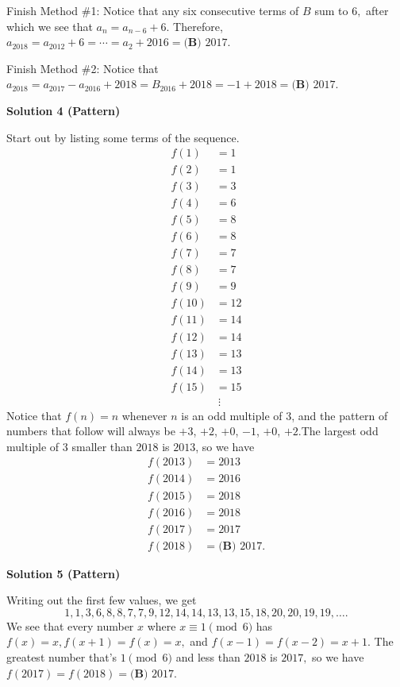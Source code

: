\begin{enumerate}
 Finish Method \#1: Notice that any six consecutive terms of $B$ sum to $6,$ after which we see that $a_n = a_{n-6} + 6.$ Therefore, $a_{2018} = a_{2012} + 6 = \cdots = a_{2} + 2016 = \boxed{\textbf{(B) } 2017}.$

 Finish Method \#2: Notice that $a_{2018} = a_{2017} - a_{2016} + 2018 = B_{2016} + 2018 = -1 + 2018 = \boxed{\textbf{(B) } 2017}.$




\textbf{Solution 4 (Pattern)}

Start out by listing some terms of the sequence. 
 \begin{align*} f(1)&=1 \\ f(2)&=1 \\ f(3)&=3 \\ f(4)&=6 \\ f(5)&=8 \\ f(6)&=8 \\  f(7)&=7 \\ f(8)&=7 \\ f(9)&=9 \\ f(10)&=12 \\ f(11)&=14 \\ f(12)&=14 \\ f(13)&=13 \\ f(14)&=13 \\ f(15)&=15 \\ & \ \vdots \end{align*}
Notice that $f(n)=n$ whenever $n$ is an odd multiple of $3$, and the pattern of numbers that follow will always be $+3$, $+2$, $+0$, $-1$, $+0$, $+2$.The largest odd multiple of $3$ smaller than $2018$ is $2013$, so we have
 \begin{align*} f(2013)&=2013 \\ f(2014)&=2016 \\ f(2015)&=2018 \\ f(2016)&=2018 \\ f(2017)&=2017 \\ f(2018)&=\boxed{\textbf{(B) } 2017}. \end{align*}





\textbf{Solution 5 (Pattern)}

Writing out the first few values, we get
 \[1,1,3,6,8,8,7,7,9,12,14,14,13,13,15,18,20,20,19,19,\ldots.\] We see that every number $x$ where $x \equiv 1\pmod 6$ has $f(x)=x,f(x+1)=f(x)=x,$ and $f(x-1)=f(x-2)=x+1.$ The greatest number that's $1\pmod{6}$ and less than $2018$ is $2017,$ so we have $f(2017)=f(2018)=\boxed{\textbf{(B) } 2017}.$





\end{enumerate}
